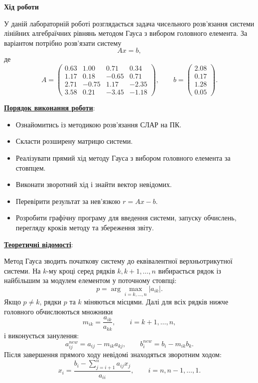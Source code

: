 \documentclass[12pt,a4paper]{article}
\begin{document}
    \begin{center} \textbf{\Large Хід роботи} \end{center}

    У даній лабораторній роботі розглядається задача чисельного розв'язання системи лінійних
    алгебраїчних рівнянь методом Гауса з вибором головного елемента. За варіантом потрібно
    розв'язати систему
    \[
        A x = b,
    \]
    де
    \[
    A =
    \begin{pmatrix}
        0.63 & 1.00 & 0.71 & 0.34 \\
        1.17 & 0.18 & -0.65 & 0.71 \\
        2.71 & -0.75 & 1.17 & -2.35 \\
        3.58 & 0.21 & -3.45 & -1.18
    \end{pmatrix},
    \qquad
    b =
    \begin{pmatrix}
        2.08 \\
        0.17 \\
        1.28 \\
        0.05
    \end{pmatrix}.
    \]

    \vspace{1em}

    \noindent
    \textbf{\underline{Порядок виконання роботи}}:

    \begin{itemize}
        \item Ознайомитись із методикою розв'язання СЛАР на ПК.
        \item Скласти розширену матрицю системи.
        \item Реалізувати прямий хід методу Гауса з вибором головного елемента за стовпцем.
        \item Виконати зворотний хід і знайти вектор невідомих.
        \item Перевірити результат за нев'язкою $r=Ax-b$.
        \item Розробити графічну програму для введення системи, запуску обчислень, перегляду
        кроків методу та збереження звіту.
    \end{itemize}

    \vspace{1em}

    \noindent
    \textbf{\underline{Теоретичні відомості}}:

    \vspace{1em}

    Метод Гауса зводить початкову систему до еквівалентної верхньотрикутної системи. На $k$-му
    кроці серед рядків $k,k+1,\ldots,n$ вибирається рядок із найбільшим за модулем елементом у
    поточному стовпці:
    \[
        p = \arg\max_{i=k,\ldots,n} |a_{ik}|.
    \]
    Якщо $p \neq k$, рядки $p$ та $k$ міняються місцями. Далі для всіх рядків нижче головного
    обчислюються множники
    \[
        m_{ik} = \frac{a_{ik}}{a_{kk}}, \qquad i=k+1,\ldots,n,
    \]
    і виконується занулення:
    \[
        a_{ij}^{new}=a_{ij}-m_{ik}a_{kj}, \qquad
        b_i^{new}=b_i-m_{ik}b_k.
    \]
    Після завершення прямого ходу невідомі знаходяться зворотним ходом:
    \[
        x_i = \frac{b_i-\sum_{j=i+1}^{n}a_{ij}x_j}{a_{ii}}, \qquad i=n,n-1,\ldots,1.
    \]
\end{document}
